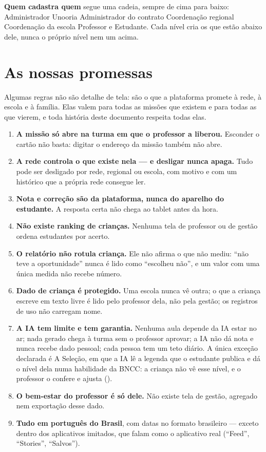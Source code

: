 \medskip
\textbf{Quem cadastra quem} segue uma cadeia, sempre de cima para baixo:
Administrador Unooria \seta{} Administrador do contrato \seta{} Coordenação
regional \seta{} Coordenação da escola \seta{} Professor e Estudante. Cada
nível cria os que estão abaixo dele, nunca o próprio nível nem um acima.

\section{As nossas promessas}
\label{sec:promessas}

Algumas regras não são detalhe de tela: são o que a plataforma promete à rede,
à escola e à família. Elas valem para todas as missões que existem e para todas
as que vierem, e toda história deste documento respeita todas elas.

\begin{enumerate}
  \item \textbf{A missão só abre na turma em que o professor a liberou.}
    Esconder o cartão não basta: digitar o endereço da missão também não abre.
  \item \textbf{A rede controla o que existe nela --- e desligar nunca apaga.}
    Tudo pode ser desligado por rede, regional ou escola, com motivo e com um
    histórico que a própria rede consegue ler.
  \item \textbf{Nota e correção são da plataforma, nunca do aparelho do
    estudante.} A resposta certa não chega ao tablet antes da hora.
  \item \textbf{Não existe ranking de crianças.} Nenhuma tela de professor ou
    de gestão ordena estudantes por acerto.
  \item \textbf{O relatório não rotula criança.} Ele não afirma o que não mediu:
    \enquote{não teve a oportunidade} nunca é lido como \enquote{escolheu não},
    e um valor com uma única medida não recebe número.
  \item \textbf{Dado de criança é protegido.} Uma escola nunca vê outra; o que
    a criança escreve em texto livre é lido pelo professor dela, não pela
    gestão; os registros de uso não carregam nome.
  \item \textbf{A IA tem limite e tem garantia.} Nenhuma aula depende da IA
    estar no ar; nada gerado chega à turma sem o professor aprovar; a IA não
    dá nota e nunca recebe dado pessoal; cada pessoa tem um teto diário. A
    única exceção declarada é A Seleção, em que a IA lê a legenda que o
    estudante publica e dá o nível dela numa habilidade da BNCC: a criança não
    vê esse nível, e o professor o confere e ajusta ().
  \item \textbf{O bem-estar do professor é só dele.} Não existe tela de gestão,
    agregado nem exportação desse dado.
  \item \textbf{Tudo em português do Brasil}, com datas no formato brasileiro
    --- exceto dentro dos aplicativos imitados, que falam como o aplicativo
    real (\enquote{Feed}, \enquote{Stories}, \enquote{Salvos}).
\end{enumerate}

